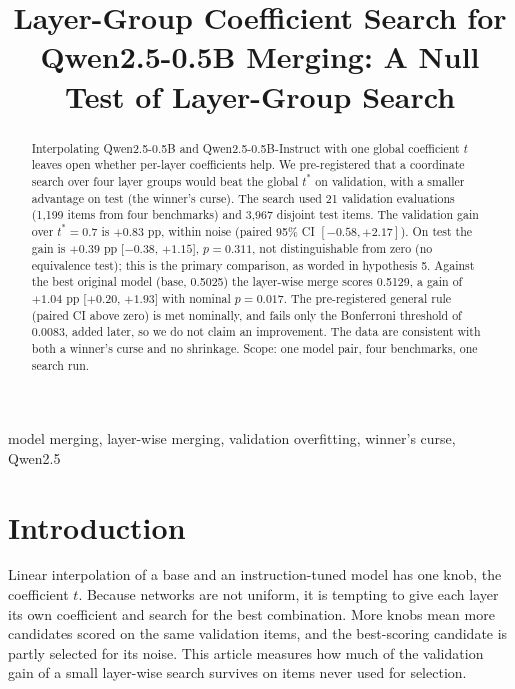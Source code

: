 \documentclass[conference]{IEEEtran}
\begin{document}
\title{Layer-Group Coefficient Search for Qwen2.5-0.5B Merging: A Null Test of Layer-Group Search}

\author{
}

\maketitle

\begin{abstract}
Interpolating Qwen2.5-0.5B and Qwen2.5-0.5B-Instruct with one global coefficient $t$ leaves open whether per-layer coefficients help. We pre-registered that a coordinate search over four layer groups would beat the global $t^*$ on validation, with a smaller advantage on test (the winner's curse). The search used 21 validation evaluations (1{,}199 items from four benchmarks) and 3{,}967 disjoint test items. The validation gain over $t^*=0.7$ is $+0.83$ pp, within noise (paired 95\% CI $[-0.58,+2.17]$). On test the gain is $+0.39$ pp [$-0.38$, $+1.15$], $p=0.311$, not distinguishable from zero (no equivalence test); this is the primary comparison, as worded in hypothesis 5. Against the best original model (base, 0.5025) the layer-wise merge scores 0.5129, a gain of $+1.04$ pp [$+0.20$, $+1.93$] with nominal $p=0.017$. The pre-registered general rule (paired CI above zero) is met nominally, and fails only the Bonferroni threshold of 0.0083, added later, so we do not claim an improvement. The data are consistent with both a winner's curse and no shrinkage. Scope: one model pair, four benchmarks, one search run.
\end{abstract}

\begin{IEEEkeywords}
model merging, layer-wise merging, validation overfitting, winner's curse, Qwen2.5
\end{IEEEkeywords}

\section{Introduction}
Linear interpolation of a base and an instruction-tuned model has one knob, the coefficient $t$. Because networks are not uniform, it is tempting to give each layer its own coefficient and search for the best combination. More knobs mean more candidates scored on the same validation items, and the best-scoring candidate is partly selected for its noise. This article measures how much of the validation gain of a small layer-wise search survives on items never used for selection.
\end{document}
